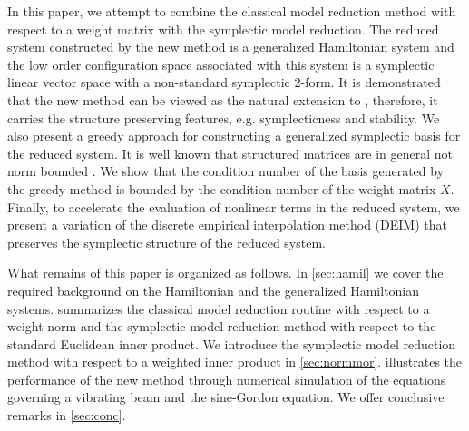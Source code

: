 In this paper, we attempt to combine the classical model reduction method with respect to a weight matrix with the symplectic model reduction. The reduced system constructed by the new method is a generalized Hamiltonian system and the low order configuration space associated with this system is a symplectic linear vector space with a non-standard symplectic 2-form. It is demonstrated that the new method can be viewed as the natural extension to \cite{doi:10.1137/17M1111991}, therefore, it carries the structure preserving features, e.g. symplecticness and stability. We also present a greedy approach for constructing a generalized symplectic basis for the reduced system. It is well known that structured matrices are in general not norm bounded \cite{Karow:2006cf}. We show that the condition number of the basis generated by the greedy method is bounded by the condition number of the weight matrix $X$. Finally, to accelerate the evaluation of nonlinear terms in the reduced system, we present a variation of the discrete empirical interpolation method (DEIM) that preserves the symplectic structure of the reduced system.

What remains of this paper is organized as follows. In \cref{sec:hamil} we cover the required background on the Hamiltonian and the generalized Hamiltonian systems.  summarizes the classical model reduction routine with respect to a weight norm and the symplectic model reduction method with respect to the standard Euclidean inner product. We introduce the symplectic model reduction method with respect to a weighted inner product in \cref{sec:normmor}.  illustrates the performance of the new method through numerical simulation of the equations governing a vibrating beam and the sine-Gordon equation. We offer conclusive remarks in \cref{sec:conc}.
